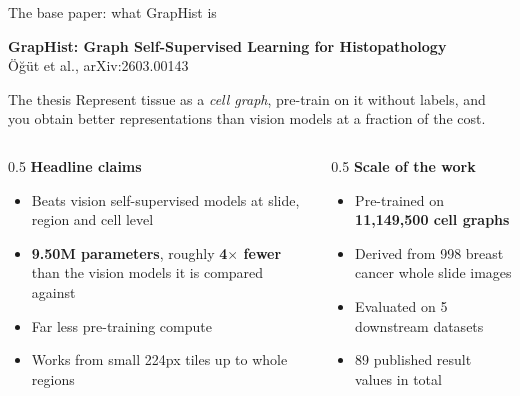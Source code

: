 \documentclass[aspectratio=169,11pt]{beamer}
\newcommand{\hl}[1]{\textcolor{haem}{\textbf{#1}}}
\begin{document}
\begin{frame}{The base paper: what GrapHist is}

  \textbf{GrapHist: Graph Self-Supervised Learning for Histopathology}\\
  {\small Ö\u{g}üt et al., arXiv:2603.00143}

  \vspace{0.5em}
  \begin{block}{The thesis}
    Represent tissue as a \emph{cell graph}, pre-train on it without labels, and
    you obtain better representations than vision models at a fraction of the
    cost.
  \end{block}

  \vspace{0.3em}
  \begin{columns}[T]
    \begin{column}{0.5\textwidth}
      \textbf{Headline claims}
      \begin{itemize}\small
        \item Beats vision self-supervised models at slide, region and cell level
        \item \hl{9.50M parameters}, roughly \hl{4$\times$ fewer} than the vision
              models it is compared against
        \item Far less pre-training compute
        \item Works from small 224px tiles up to whole regions
      \end{itemize}
    \end{column}
    \begin{column}{0.5\textwidth}
      \textbf{Scale of the work}
      \begin{itemize}\small
        \item Pre-trained on \hl{11,149,500 cell graphs}
        \item Derived from 998 breast cancer whole slide images
        \item Evaluated on 5 downstream datasets
        \item 89 published result values in total
      \end{itemize}
    \end{column}
  \end{columns}

\end{frame}
\end{document}
